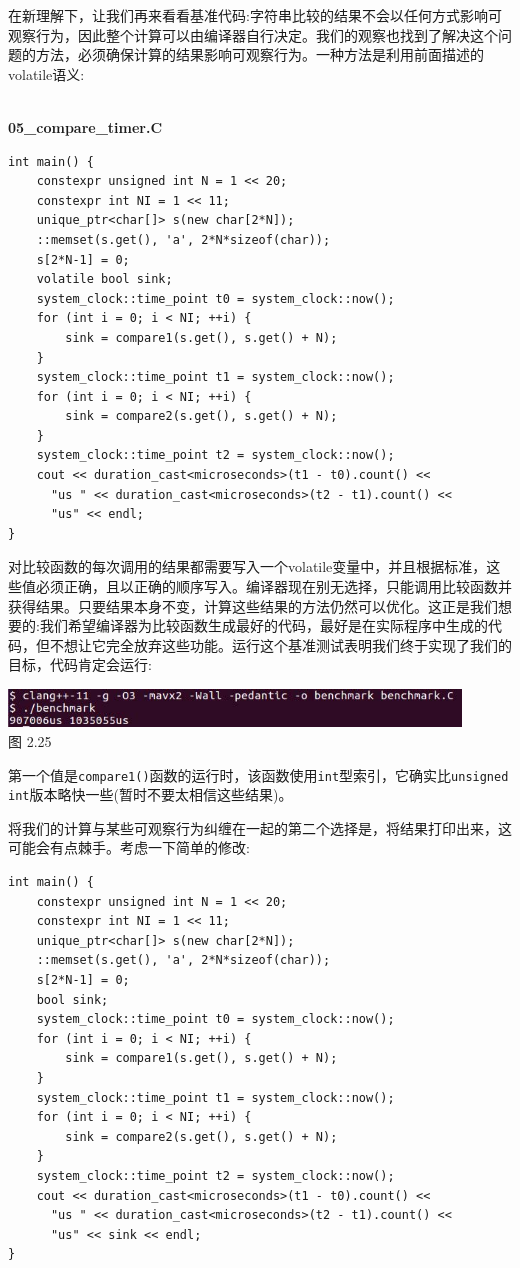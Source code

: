 在新理解下，让我们再来看看基准代码:字符串比较的结果不会以任何方式影响可观察行为，因此整个计算可以由编译器自行决定。我们的观察也找到了解决这个问题的方法，必须确保计算的结果影响可观察行为。一种方法是利用前面描述的volatile语义:

\hspace*{\fill} \\ %
\noindent
\textbf{05\_compare\_timer.C}
\begin{lstlisting}[style=styleCXX]
int main() {
	constexpr unsigned int N = 1 << 20;
	constexpr int NI = 1 << 11;
	unique_ptr<char[]> s(new char[2*N]);
	::memset(s.get(), 'a', 2*N*sizeof(char));
	s[2*N-1] = 0;
	volatile bool sink;
	system_clock::time_point t0 = system_clock::now();
	for (int i = 0; i < NI; ++i) {
		sink = compare1(s.get(), s.get() + N);
	}
	system_clock::time_point t1 = system_clock::now();
	for (int i = 0; i < NI; ++i) {
		sink = compare2(s.get(), s.get() + N);
	}
	system_clock::time_point t2 = system_clock::now();
	cout << duration_cast<microseconds>(t1 - t0).count() <<
	  "us " << duration_cast<microseconds>(t2 - t1).count() <<
	  "us" << endl;
}
\end{lstlisting}

对比较函数的每次调用的结果都需要写入一个volatile变量中，并且根据标准，这些值必须正确，且以正确的顺序写入。编译器现在别无选择，只能调用比较函数并获得结果。只要结果本身不变，计算这些结果的方法仍然可以优化。这正是我们想要的:我们希望编译器为比较函数生成最好的代码，最好是在实际程序中生成的代码，但不想让它完全放弃这些功能。运行这个基准测试表明我们终于实现了我们的目标，代码肯定会运行:

\begin{center}
\includegraphics[width=0.9\textwidth]{content/1/chapter2/images/25.jpg}\\
图 2.25
\end{center}

第一个值是\texttt{compare1()}函数的运行时，该函数使用\texttt{int}型索引，它确实比\texttt{unsigned int}版本略快一些(暂时不要太相信这些结果)。

将我们的计算与某些可观察行为纠缠在一起的第二个选择是，将结果打印出来，这可能会有点棘手。考虑一下简单的修改:

\begin{lstlisting}[style=styleCXX]
int main() {
	constexpr unsigned int N = 1 << 20;
	constexpr int NI = 1 << 11;
	unique_ptr<char[]> s(new char[2*N]);
	::memset(s.get(), 'a', 2*N*sizeof(char));
	s[2*N-1] = 0;
	bool sink;
	system_clock::time_point t0 = system_clock::now();
	for (int i = 0; i < NI; ++i) {
		sink = compare1(s.get(), s.get() + N);
	}
	system_clock::time_point t1 = system_clock::now();
	for (int i = 0; i < NI; ++i) {
		sink = compare2(s.get(), s.get() + N);
	}
	system_clock::time_point t2 = system_clock::now();
	cout << duration_cast<microseconds>(t1 - t0).count() <<
	  "us " << duration_cast<microseconds>(t2 - t1).count() <<
	  "us" << sink << endl;
}
\end{lstlisting}

